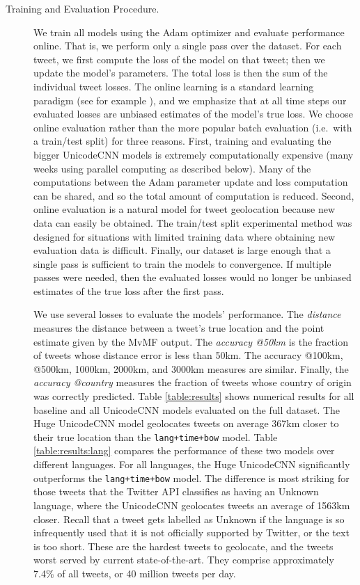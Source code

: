 \documentclass[sigconf,anonymous,review]{acmart}
\newcommand{\str}[1]{\texttt{#1}}
\newcommand{\defn}[1]{\textit{#1}}
\begin{document}
\begin{description}

\item[Training and Evaluation Procedure.]
We train all models using the Adam optimizer \citep{kingma2014adam} and evaluate performance online.
That is, we perform only a single pass over the dataset.
For each tweet, we first compute the loss of the model on that tweet;
then we update the model's parameters.
The total loss is then the sum of the individual tweet losses.
The online learning is a standard learning paradigm (see for example \citep{understandingml}),
and we emphasize that at all time steps our evaluated losses are unbiased estimates of the model's true loss.
We choose online evaluation rather than the more popular batch evaluation (i.e.\ with a train/test split) for three reasons.
First, training and evaluating the bigger UnicodeCNN models is extremely computationally expensive 
(many weeks using parallel computing as described below).
Many of the computations between the Adam parameter update and loss computation can be shared,
and so the total amount of computation is reduced.
Second, online evaluation is a natural model for tweet geolocation because new data can easily be obtained.
The train/test split experimental method was designed for situations with limited training data where obtaining new evaluation data is difficult.
Finally, our dataset is large enough that a single pass is sufficient to train the models to convergence.
If multiple passes were needed, then the evaluated losses would no longer be unbiased estimates of the true loss after the first pass.

We use several losses to evaluate the models' performance.
The \defn{distance} measures the distance between a tweet's true location and the point estimate given by the MvMF output.
The \defn{accuracy @50km} is the fraction of tweets whose distance error is less than 50km.
The {accuracy @100km, @500km, 1000km, 2000km, and 3000km} measures are similar.
Finally, the \defn{accuracy @country} measures the fraction of tweets whose country of origin was correctly predicted.
Table \ref{table:results} shows numerical results for all baseline and all UnicodeCNN models evaluated on the full dataset.
The Huge UnicodeCNN model geolocates tweets on average 367km closer to their true location than the \str{lang+time+bow} model.
Table \ref{table:results:lang} compares the performance of these two models over different languages.
For all languages, the Huge UnicodeCNN significantly outperforms the \str{lang+time+bow} model.
The difference is most striking for those tweets that the Twitter API classifies as having an Unknown language,
where the UnicodeCNN geolocates tweets an average of 1563km closer.
Recall that a tweet gets labelled as Unknown if the language is so infrequently used that it is not officially supported by Twitter,
or the text is too short.
These are the hardest tweets to geolocate,
and the tweets worst served by current state-of-the-art.
They comprise approximately 7.4\% of all tweets,
or 40 million tweets per day.


\end{description}
\end{document}
